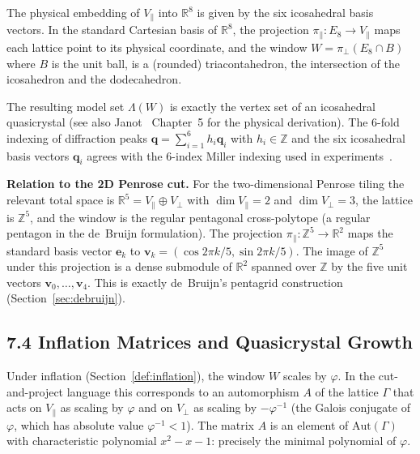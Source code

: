 The physical embedding of \(V_\parallel\) into
\(\mathbb{R}^8\) is given by the six icosahedral
basis vectors. In the standard Cartesian basis of
\(\mathbb{R}^8\), the projection \(\pi_\parallel :
E_8 \to V_\parallel\) maps each lattice point to
its physical coordinate, and the window
\(W = \pi_\perp(E_8 \cap B)\) where \(B\) is the
unit ball, is a (rounded) triacontahedron, the
intersection of the icosahedron and the
dodecahedron.

The resulting model set \(\Lambda(W)\) is exactly
the vertex set of an icosahedral quasicrystal
(see also Janot~\cite{janot_quasicrystals} Chapter~5
for the physical derivation).
The 6-fold indexing of diffraction peaks
\(\mathbf{q} = \sum_{i=1}^{6} h_i \mathbf{q}_i\)
with \(h_i \in \mathbb{Z}\) and the six
icosahedral basis vectors \(\mathbf{q}_i\) agrees
with the 6-index Miller indexing used in
experiments~\cite{steurer2009quasicrystals}.

\medskip
\noindent\textbf{Relation to the 2D Penrose cut.}
For the two-dimensional Penrose tiling the
relevant total space is \(\mathbb{R}^5 = V_\parallel
\oplus V_\perp\) with \(\dim V_\parallel = 2\) and
\(\dim V_\perp = 3\), the lattice is \(\mathbb{Z}^5\),
and the window is the regular
pentagonal cross-polytope (a regular pentagon in the
de~Bruijn formulation). The projection
\(\pi_\parallel : \mathbb{Z}^5 \to \mathbb{R}^2\)
maps the standard basis vector \(\mathbf{e}_k\) to
\(\mathbf{v}_k = (\cos 2\pi k/5, \sin 2\pi k/5)\).
The image of \(\mathbb{Z}^5\) under this projection
is a dense submodule of \(\mathbb{R}^2\) spanned
over \(\mathbb{Z}\) by the five unit vectors
\(\mathbf{v}_0, \ldots, \mathbf{v}_4\). This is
exactly de~Bruijn's pentagrid construction
(Section~\ref{sec:debruijn}).

\subsection{7.4 Inflation Matrices and
Quasicrystal Growth}\label{sec:inflation-matrices}

Under inflation (Section~\ref{def:inflation}), the
window \(W\) scales by \(\varphi\). In the
cut-and-project language this corresponds to an
automorphism \(A\) of the lattice \(\Gamma\) that
acts on \(V_\parallel\) as scaling by \(\varphi\)
and on \(V_\perp\) as scaling by \(-\varphi^{-1}\)
(the Galois conjugate of \(\varphi\), which has
absolute value \(\varphi^{-1} < 1\)). The matrix
\(A\) is an element of \(\mathrm{Aut}(\Gamma)\)
with characteristic polynomial \(x^2 - x - 1\):
precisely the minimal polynomial of \(\varphi\).

